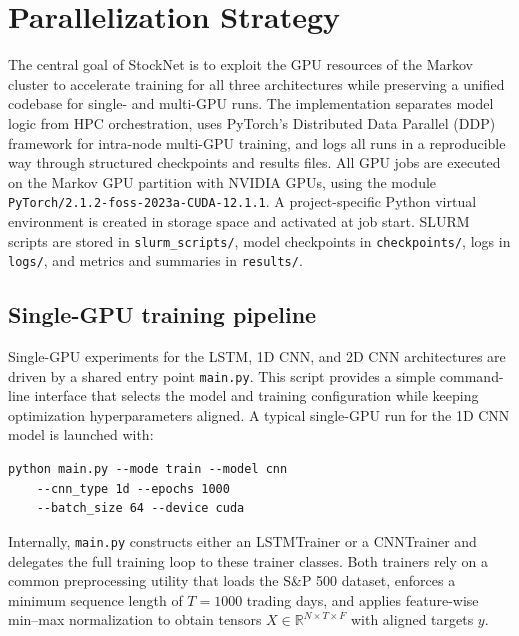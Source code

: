 \documentclass[sigconf]{acmart}
\begin{document}
\section{Parallelization Strategy}

The central goal of StockNet is to exploit the GPU resources of the Markov cluster to accelerate training for all three architectures while preserving a unified codebase for single- and multi-GPU runs. The implementation separates model logic from HPC orchestration, uses PyTorch's Distributed Data Parallel (DDP) framework for intra-node multi-GPU training, and logs all runs in a reproducible way through structured checkpoints and results files. All GPU jobs are executed on the Markov GPU partition with NVIDIA GPUs, using the module 
\texttt{PyTorch/2.1.2-foss-2023a-CUDA-12.1.1}. A project-specific Python virtual environment is created in storage space and activated at job start. SLURM scripts are stored in \texttt{slurm\_scripts/}, model checkpoints in \texttt{checkpoints/}, logs in \texttt{logs/}, and metrics and summaries in \texttt{results/}.

\subsection{Single-GPU training pipeline}

Single-GPU experiments for the LSTM, 1D CNN, and 2D CNN architectures are driven by a shared entry point \texttt{main.py}. This script provides a simple command-line interface that selects the model and training configuration while keeping optimization hyperparameters aligned. A typical single-GPU run for the 1D CNN model is launched with:
\begin{verbatim}
python main.py --mode train --model cnn 
    --cnn_type 1d --epochs 1000 
    --batch_size 64 --device cuda
\end{verbatim}
Internally, \texttt{main.py} constructs either an LSTMTrainer or a CNNTrainer and delegates the full training loop to these trainer classes.  Both trainers rely on a common preprocessing utility that loads the S\&P 500 dataset, enforces a minimum sequence length of \(T = 1000\) trading days, and applies feature-wise min–max normalization to obtain tensors \(X \in \mathbb{R}^{N \times T \times F}\) with aligned targets \(y\).
\end{document}
